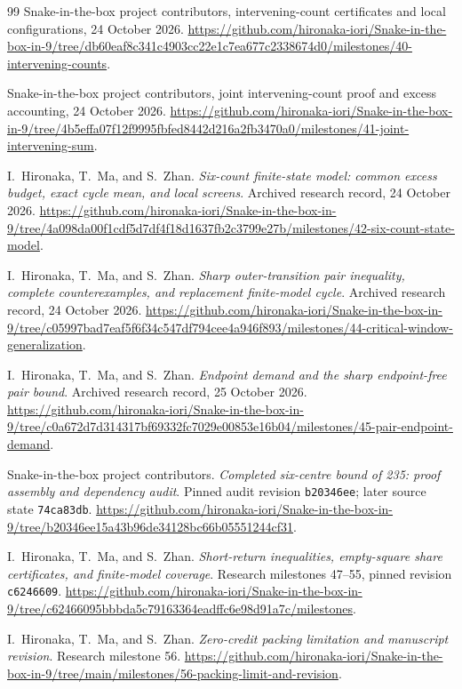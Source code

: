 \documentclass[11pt,a4paper]{article}
\theoremstyle{definition}
\theoremstyle{remark}
\begin{document}
\begin{thebibliography}{99}
Snake-in-the-box project contributors, intervening-count certificates and local configurations, 24 October 2026.
\url{https://github.com/hironaka-iori/Snake-in-the-box-in-9/tree/db60eaf8c341c4903cc22e1c7ea677c2338674d0/milestones/40-intervening-counts}.

Snake-in-the-box project contributors, joint intervening-count proof and excess accounting, 24 October 2026.
\url{https://github.com/hironaka-iori/Snake-in-the-box-in-9/tree/4b5effa07f12f9995fbfed8442d216a2fb3470a0/milestones/41-joint-intervening-sum}.

I.~Hironaka, T.~Ma, and S.~Zhan. \emph{Six-count finite-state model: common excess budget, exact cycle mean, and local screens}. Archived research record, 24 October 2026.
\url{https://github.com/hironaka-iori/Snake-in-the-box-in-9/tree/4a098da00f1cdf5d7df4f18d1637fb2c3799e27b/milestones/42-six-count-state-model}.

I.~Hironaka, T.~Ma, and S.~Zhan. \emph{Sharp outer-transition pair inequality, complete counterexamples, and replacement finite-model cycle}. Archived research record, 24 October 2026.
\url{https://github.com/hironaka-iori/Snake-in-the-box-in-9/tree/c05997bad7eaf5f6f34c547df794cee4a946f893/milestones/44-critical-window-generalization}.

I.~Hironaka, T.~Ma, and S.~Zhan. \emph{Endpoint demand and the sharp endpoint-free pair bound}. Archived research record, 25 October 2026.
\url{https://github.com/hironaka-iori/Snake-in-the-box-in-9/tree/c0a672d7d314317bf69332fc7029e00853e16b04/milestones/45-pair-endpoint-demand}.

Snake-in-the-box project contributors. \emph{Completed six-centre bound of 235: proof assembly and dependency audit}. Pinned audit revision \texttt{b20346ee}; later source state \texttt{74ca83db}.
\url{https://github.com/hironaka-iori/Snake-in-the-box-in-9/tree/b20346ee15a43b96de34128bc66b05551244cf31}.

I.~Hironaka, T.~Ma, and S.~Zhan. \emph{Short-return inequalities, empty-square share certificates, and finite-model coverage}. Research milestones 47--55, pinned revision \texttt{c6246609}.
\url{https://github.com/hironaka-iori/Snake-in-the-box-in-9/tree/c62466095bbbda5c79163364eadffc6e98d91a7c/milestones}.

I.~Hironaka, T.~Ma, and S.~Zhan. \emph{Zero-credit packing limitation and manuscript revision}. Research milestone 56.
\url{https://github.com/hironaka-iori/Snake-in-the-box-in-9/tree/main/milestones/56-packing-limit-and-revision}.


\end{thebibliography}
\end{document}
